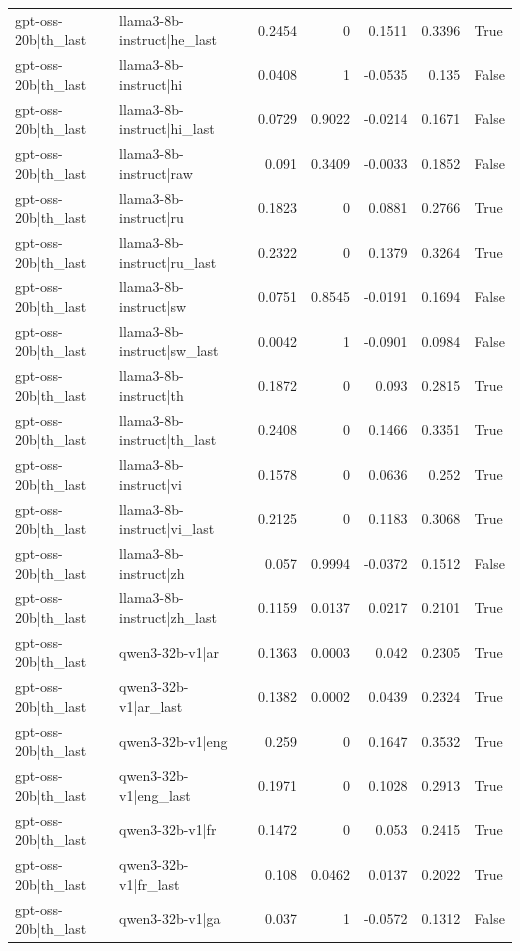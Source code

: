 \begin{table}
\begin{tabular}{l l r r r r l}
gpt-oss-20b|th_last & llama3-8b-instruct|he_last & 0.2454 & 0 & 0.1511 & 0.3396 & True \\
gpt-oss-20b|th_last & llama3-8b-instruct|hi & 0.0408 & 1 & -0.0535 & 0.135 & False \\
gpt-oss-20b|th_last & llama3-8b-instruct|hi_last & 0.0729 & 0.9022 & -0.0214 & 0.1671 & False \\
gpt-oss-20b|th_last & llama3-8b-instruct|raw & 0.091 & 0.3409 & -0.0033 & 0.1852 & False \\
gpt-oss-20b|th_last & llama3-8b-instruct|ru & 0.1823 & 0 & 0.0881 & 0.2766 & True \\
gpt-oss-20b|th_last & llama3-8b-instruct|ru_last & 0.2322 & 0 & 0.1379 & 0.3264 & True \\
gpt-oss-20b|th_last & llama3-8b-instruct|sw & 0.0751 & 0.8545 & -0.0191 & 0.1694 & False \\
gpt-oss-20b|th_last & llama3-8b-instruct|sw_last & 0.0042 & 1 & -0.0901 & 0.0984 & False \\
gpt-oss-20b|th_last & llama3-8b-instruct|th & 0.1872 & 0 & 0.093 & 0.2815 & True \\
gpt-oss-20b|th_last & llama3-8b-instruct|th_last & 0.2408 & 0 & 0.1466 & 0.3351 & True \\
gpt-oss-20b|th_last & llama3-8b-instruct|vi & 0.1578 & 0 & 0.0636 & 0.252 & True \\
gpt-oss-20b|th_last & llama3-8b-instruct|vi_last & 0.2125 & 0 & 0.1183 & 0.3068 & True \\
gpt-oss-20b|th_last & llama3-8b-instruct|zh & 0.057 & 0.9994 & -0.0372 & 0.1512 & False \\
gpt-oss-20b|th_last & llama3-8b-instruct|zh_last & 0.1159 & 0.0137 & 0.0217 & 0.2101 & True \\
gpt-oss-20b|th_last & qwen3-32b-v1|ar & 0.1363 & 0.0003 & 0.042 & 0.2305 & True \\
gpt-oss-20b|th_last & qwen3-32b-v1|ar_last & 0.1382 & 0.0002 & 0.0439 & 0.2324 & True \\
gpt-oss-20b|th_last & qwen3-32b-v1|eng & 0.259 & 0 & 0.1647 & 0.3532 & True \\
gpt-oss-20b|th_last & qwen3-32b-v1|eng_last & 0.1971 & 0 & 0.1028 & 0.2913 & True \\
gpt-oss-20b|th_last & qwen3-32b-v1|fr & 0.1472 & 0 & 0.053 & 0.2415 & True \\
gpt-oss-20b|th_last & qwen3-32b-v1|fr_last & 0.108 & 0.0462 & 0.0137 & 0.2022 & True \\
gpt-oss-20b|th_last & qwen3-32b-v1|ga & 0.037 & 1 & -0.0572 & 0.1312 & False \\

\end{tabular}
\end{table}
